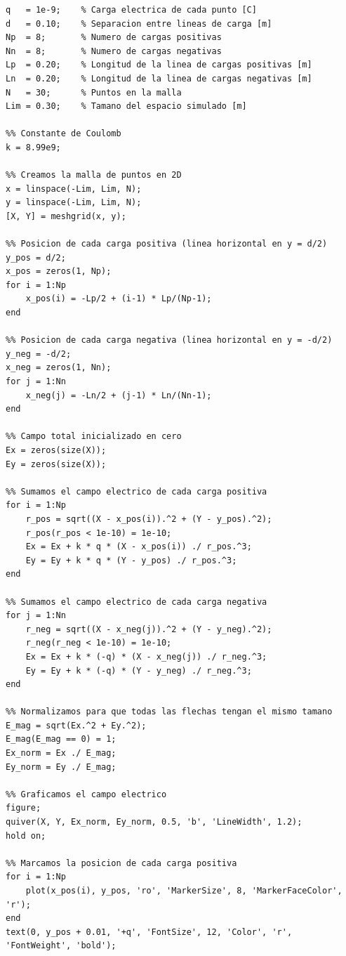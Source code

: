 
\begin{lstlisting}[style=Matlab-editor]
%% Parametros que puedes cambiar
q   = 1e-9;    % Carga electrica de cada punto [C]
d   = 0.10;    % Separacion entre lineas de carga [m]
Np  = 8;       % Numero de cargas positivas
Nn  = 8;       % Numero de cargas negativas
Lp  = 0.20;    % Longitud de la linea de cargas positivas [m]
Ln  = 0.20;    % Longitud de la linea de cargas negativas [m]
N   = 30;      % Puntos en la malla
Lim = 0.30;    % Tamano del espacio simulado [m]

%% Constante de Coulomb
k = 8.99e9;

%% Creamos la malla de puntos en 2D
x = linspace(-Lim, Lim, N);
y = linspace(-Lim, Lim, N);
[X, Y] = meshgrid(x, y);

%% Posicion de cada carga positiva (linea horizontal en y = d/2)
y_pos = d/2;
x_pos = zeros(1, Np);
for i = 1:Np
    x_pos(i) = -Lp/2 + (i-1) * Lp/(Np-1);
end

%% Posicion de cada carga negativa (linea horizontal en y = -d/2)
y_neg = -d/2;
x_neg = zeros(1, Nn);
for j = 1:Nn
    x_neg(j) = -Ln/2 + (j-1) * Ln/(Nn-1);
end

%% Campo total inicializado en cero
Ex = zeros(size(X));
Ey = zeros(size(X));

%% Sumamos el campo electrico de cada carga positiva
for i = 1:Np
    r_pos = sqrt((X - x_pos(i)).^2 + (Y - y_pos).^2);
    r_pos(r_pos < 1e-10) = 1e-10;
    Ex = Ex + k * q * (X - x_pos(i)) ./ r_pos.^3;
    Ey = Ey + k * q * (Y - y_pos) ./ r_pos.^3;
end

%% Sumamos el campo electrico de cada carga negativa
for j = 1:Nn
    r_neg = sqrt((X - x_neg(j)).^2 + (Y - y_neg).^2);
    r_neg(r_neg < 1e-10) = 1e-10;
    Ex = Ex + k * (-q) * (X - x_neg(j)) ./ r_neg.^3;
    Ey = Ey + k * (-q) * (Y - y_neg) ./ r_neg.^3;
end

%% Normalizamos para que todas las flechas tengan el mismo tamano
E_mag = sqrt(Ex.^2 + Ey.^2);
E_mag(E_mag == 0) = 1;
Ex_norm = Ex ./ E_mag;
Ey_norm = Ey ./ E_mag;

%% Graficamos el campo electrico
figure;
quiver(X, Y, Ex_norm, Ey_norm, 0.5, 'b', 'LineWidth', 1.2);
hold on;

%% Marcamos la posicion de cada carga positiva
for i = 1:Np
    plot(x_pos(i), y_pos, 'ro', 'MarkerSize', 8, 'MarkerFaceColor', 'r');
end
text(0, y_pos + 0.01, '+q', 'FontSize', 12, 'Color', 'r', 'FontWeight', 'bold');


\end{lstlisting}
